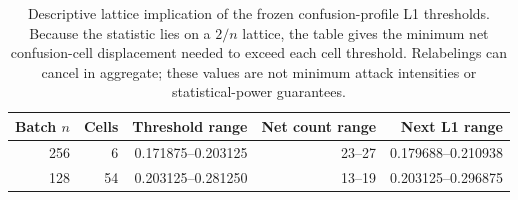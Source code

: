 \begin{table}[!tbp]
\caption{Descriptive lattice implication of the frozen confusion-profile L1 thresholds. Because the statistic lies on a $2/n$ lattice, the table gives the minimum net confusion-cell displacement needed to exceed each cell threshold. Relabelings can cancel in aggregate; these values are not minimum attack intensities or statistical-power guarantees.}
\label{tab:v137-mde}
\centering\scriptsize\setlength{\tabcolsep}{2pt}
\begin{tabular}{@{}rrrrr@{}}
\toprule
Batch $n$ & Cells & Threshold range & Net count range & Next L1 range \\
\midrule
256 & 6 & 0.171875--0.203125 & 23--27 & 0.179688--0.210938 \\
128 & 54 & 0.203125--0.281250 & 13--19 & 0.203125--0.296875 \\
\bottomrule
\end{tabular}
\end{table}
